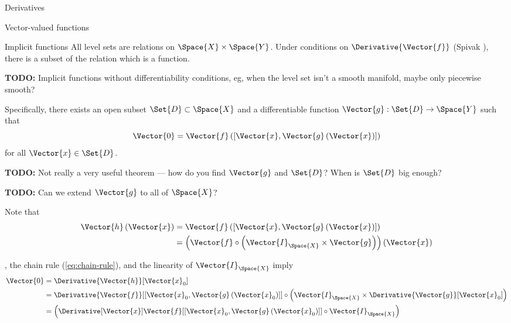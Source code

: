 \begin{plSection}{Derivatives}
\begin{plSection}{Vector-valued functions}
\begin{plSection}{Implicit functions}
All level sets are relations on $\Space{X} \times \Space{Y}$.
Under conditions on $\Derivative{\Vector{f}}$
(Spivak \cite[Theorem~2-12]{Spivak:1965:CalculusOnManifolds}),
there is a subset of the relation which is a 
function.

\textbf{TODO:} Implicit functions without differentiability
conditions, eg, when the level set isn't a smooth manifold,
maybe only piecewise smooth?

Specifically, 
there exists an open subset $\Set{D}  \subset \Space{X}$
and a differentiable function $\Vector{g} : \Set{D} \rightarrow \Space{Y}$
such that 
\begin{equation}\label{eq:Implicit-function}
\Vector{0} = \Vector{f}\left( \left[ \Vector{x} , \Vector{g} \left( \Vector{x} \right) \right] \right)
\end{equation}
for all 
$\Vector{x} \in  \Set{D}$.

\textbf{TODO:} Not really a very useful theorem --- 
how do you find $\Vector{g}$ and $\Set{D}$?
When is $\Set{D}$ big enough?

\textbf{TODO:} Can we extend $\Vector{g}$ to all of $\Space{X}$?

Note that 
\begin{equation}
\begin{aligned}
\Vector{h}\left(\Vector{x}\right) 
& = 
\Vector{f}\left( \left[ \Vector{x} , \Vector{g} \left( \Vector{x} \right) \right] \right)
\\
& =
\left( \Vector{f} \circ \left( \Vector{I}_{\Space{X}} \times \Vector{g} \right) \right) 
\left( \Vector{x} \right)
\end{aligned} 
\end{equation}

, 
the chain rule (\cref{eq:chain-rule}),
and the linearity of $\Vector{I}_{\Space{X}}$
imply
\begin{equation}\label{eq:Implicit-derivative}
\begin{aligned}
\Vector{0}
 & = \Derivative{\Vector{h}}[\Vector{x}_0]
\\
& = 
\Derivative{\Vector{f}}
[\left[ 
\Vector{x}_0 , \Vector{g}\left( \Vector{x}_0 \right) 
\right]]
\circ \left( 
\Vector{I}_{\Space{X}} 
\times 
\Derivative{\Vector{g}}[\Vector{x}_0]
\right)
\\
& = 
\left(
\Derivative[\Vector{x}]
{\Vector{f}}
[\left[ 
\Vector{x}_0 , \Vector{g} \left( \Vector{x}_0 \right)
\right]]
\circ 
\Vector{I}_{\Space{X}}
\right)
\end{aligned}
\end{equation}


\end{plSection}
\end{plSection}
\end{plSection}
